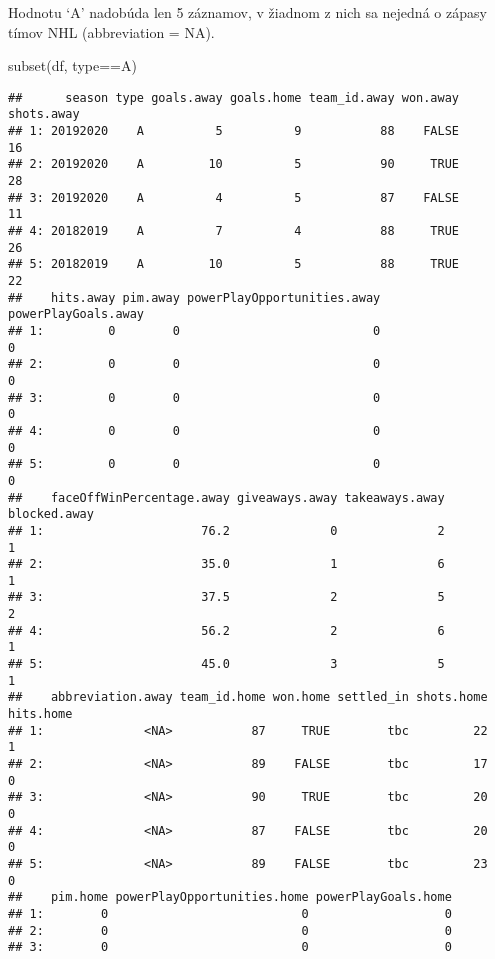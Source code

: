 \documentclass[
]{article}
\newenvironment{Shaded}{\begin{snugshade}}{\end{snugshade}}
\newcommand{\FunctionTok}[1]{\textcolor[rgb]{0.00,0.00,0.00}{#1}}
\newcommand{\NormalTok}[1]{#1}
\newcommand{\SpecialCharTok}[1]{\textcolor[rgb]{0.00,0.00,0.00}{#1}}
\newcommand{\StringTok}[1]{\textcolor[rgb]{0.31,0.60,0.02}{#1}}
\begin{document}
Hodnotu `A' nadobúda len 5 záznamov, v žiadnom z nich sa nejedná o
zápasy tímov NHL (abbreviation = NA).

\begin{Shaded}
\begin{Highlighting}[]
\FunctionTok{subset}\NormalTok{(df, type}\SpecialCharTok{==}\StringTok{\textquotesingle{}A\textquotesingle{}}\NormalTok{)}
\end{Highlighting}
\end{Shaded}

\begin{verbatim}
##      season type goals.away goals.home team_id.away won.away shots.away
## 1: 20192020    A          5          9           88    FALSE         16
## 2: 20192020    A         10          5           90     TRUE         28
## 3: 20192020    A          4          5           87    FALSE         11
## 4: 20182019    A          7          4           88     TRUE         26
## 5: 20182019    A         10          5           88     TRUE         22
##    hits.away pim.away powerPlayOpportunities.away powerPlayGoals.away
## 1:         0        0                           0                   0
## 2:         0        0                           0                   0
## 3:         0        0                           0                   0
## 4:         0        0                           0                   0
## 5:         0        0                           0                   0
##    faceOffWinPercentage.away giveaways.away takeaways.away blocked.away
## 1:                      76.2              0              2            1
## 2:                      35.0              1              6            1
## 3:                      37.5              2              5            2
## 4:                      56.2              2              6            1
## 5:                      45.0              3              5            1
##    abbreviation.away team_id.home won.home settled_in shots.home hits.home
## 1:              <NA>           87     TRUE        tbc         22         1
## 2:              <NA>           89    FALSE        tbc         17         0
## 3:              <NA>           90     TRUE        tbc         20         0
## 4:              <NA>           87    FALSE        tbc         20         0
## 5:              <NA>           89    FALSE        tbc         23         0
##    pim.home powerPlayOpportunities.home powerPlayGoals.home
## 1:        0                           0                   0
## 2:        0                           0                   0
## 3:        0                           0                   0

\end{verbatim}
\end{document}

